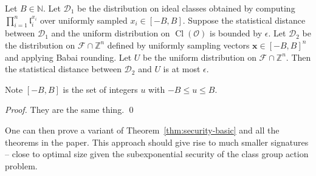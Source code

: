 \documentclass{llncs}
\newcommand{\D}{\mathcal{D}}
\newcommand{\FF}{\mathcal{F}}
\newcommand{\N}{\mathbb{N}}
\newcommand{\OO}{\mathcal{O}}
\newcommand{\Z}{\mathbb{Z}}
\DeclareMathOperator{\Cl}{Cl}
\renewcommand{\l}{\mathfrak{l}}
\newcommand{\x}{\mathbf{x}}
\begin{document}
\begin{lemma} \label{lem:sim1}
Let $B \in \N$. Let $\D_1$ be the distribution on ideal classes obtained by computing $\prod_{i=1}^n \l_i^{x_i}$ over uniformly sampled $x_i \in [-B,B]$.
Suppose the statistical distance between $\D_1$ and the uniform distribution on $\Cl(\OO)$ is bounded by $\epsilon$.
Let $\D_2$ be the distribution on $\FF \cap \Z^n$ defined by uniformly sampling vectors $\x \in [-B,B]^n$ and applying Babai rounding.
Let $U$ be the uniform distribution on $\FF \cap \Z^n$.
Then the statistical distance between $\D_2$ and $U$ is at most $\epsilon$.
\end{lemma}

Note $[-B,B]$ is the set of integers $u$ with $-B \le u \le B$.


\begin{proof}
They are the same thing. \qed
\end{proof}


One can then prove a variant of Theorem~\ref{thm:security-basic} and all the theorems in the paper. This approach should give rise to much smaller signatures -- close to optimal size given the subexponential security of the class group action problem.
\end{document}
